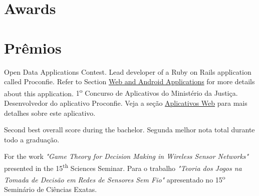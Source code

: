  {\section{Awards}\label{sec:awards}}{\section{Prêmios}\label{sec:awards}}

	{
		{Open Data Applications Contest. Lead developer of a Ruby on Rails application called Proconfie. Refer to Section \hyperref[sec:web_app]{Web and Android Applications} for more details about this application.}
		{1\textsuperscript{o} Concurso de Aplicativos do Ministério da Justiça. Desenvolvedor do aplicativo Proconfie. Veja a seção \hyperref[sec:web_app]{Aplicativos Web} para mais detalhes sobre este aplicativo.}}

	{
		        {Second best overall score during the bachelor.}
		        {Segunda melhor nota total durante todo a graduação.}}

	{
		{For the work \emph{"Game Theory for Decision Making in Wireless Sensor Networks"} presented in the 15\textsuperscript{th} Sciences Seminar.}
		{Para o trabalho \emph{"Teoria dos Jogos na Tomada de Decisão em Redes de Sensores Sem Fio"} apresentado no 15\textsuperscript{o} Seminário de Ciências Exatas.}}



